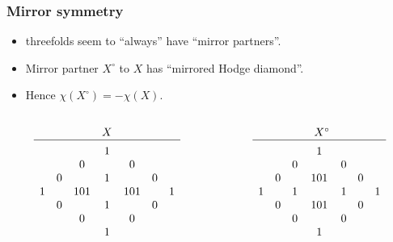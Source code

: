 \begin{frame}
\frametitle{Mirror symmetry}

\begin{itemize}
	\item \CY threefolds seem to ``always'' have ``mirror partners''.
	\item Mirror partner $X^\circ$ to $X$ has ``mirrored Hodge diamond''.
	\item Hence $\chi(X^\circ) = - \chi(X)$.
\end{itemize}

\unskip
\begin{columns}[onlytextwidth]
    {
        \begin{column}{0.48\textwidth}
            \[
                \begin{array}[c]{ccccccc}
                    &&& X                    \\
                    \hline                   \\[-1.8ex]
                    &&& 1                    \\
                    &&  0 && 0               \\
                    &   0 && 1   && 0        \\
                        1 && 101 && 101 && 1 \\
                    &   0 && 1   && 0        \\
                    &&  0 && 0               \\
                    &&& 1
                \end{array}
            \]
        \end{column}
    }

    {
        \begin{column}{0.48\textwidth}
            \[
                \begin{array}[c]{ccccccc}
                    &&& \phantom{^\circ}X^\circ \\
                    \hline                      \\[-1.8ex]
                    &&& 1                       \\  
                    &&  0 && 0                  \\
                    &   0 && 101 && 0           \\
                        1 && 1   && 1 && 1      \\
                    &   0 && 101 && 0           \\
                    &&  0 && 0                  \\
                    &&& 1
                \end{array}
            \]
        \end{column}
    }
\end{columns}


\end{frame}